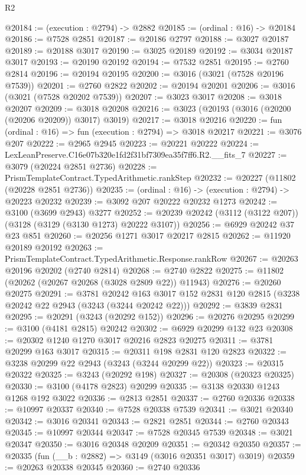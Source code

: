 \begin{lexlean}{R2}
\begin{coremodule}
@20184 := (execution : @2794) -> @2882
@20185 := (ordinal : @16) -> @20184
@20186 := @7528 @2851
@20187 := @20186 @2797
@20188 := @3027 @20187
@20189 := @20188 @3017
@20190 := @3025 @20189
@20192 := @3034 @20187 @3017
@20193 := @20190 @20192
@20194 := @7532 @2851
@20195 := @2760 @2814
@20196 := @20194 @20195
@20200 := @3016 (@3021 (@7528 @20196 @7539))
@20201 := @2760 @2822
@20202 := @20194 @20201
@20206 := @3016 (@3021 (@7528 @20202 @7539))
@20207 := @3023 @3017
@20208 := @3018 @20207
@20209 := @3018 @20208
@20216 := @3023 (@20193 (@3016 (@20200 (@20206 @20209)) @3017) @3019)
@20217 := @3018 @20216
@20220 := fun (ordinal : @16) => fun (execution : @2794) => @3018 @20217
@20221 := @3076 @207
@20222 := @2965 @2945
@20223 := @20221 @20222
@20224 := LexLeanPreserve.C16e07b320e1fd2f31bf7309ea35f7ff6.R2.__fits_7
@20227 := @3079 (@20224 @2851 @2736)
@20228 := PrismTemplateContract.TypedArithmetic.rankStep
@20232 := @20227 (@11802 (@20228 @2851 @2736))
@20235 := (ordinal : @16) -> (execution : @2794) -> @20223 @20232
@20239 := @3092 @207 @20222 @20232 @1273
@20242 := @3100 (@3699 @2943) @3277
@20252 := @20239 @20242 (@3112 (@3122 @207)) (@3128 (@3129 (@3130 @1273) @20222 @3107))
@20256 := @6929 @20242 @37 @23 @851
@20260 := @20256 @1271 @3017 @20217 @2815
@20262 := @11920 @20189 @20192
@20263 := PrismTemplateContract.TypedArithmetic.Response.rankRow
@20267 := @20263 @20196 @20202 (@2740 @2814)
@20268 := @2740 @2822
@20275 := @11802 (@20262 (@20267 @20268 (@3028 @2809 @22)) @11943)
@20276 := @20260 @20275
@20291 := @3781
    @20242
    @163
    @3017
    @152
    @2831
    @120
    @2815
    (@3238 @20242 @22 @2943 (@3243 (@3244 @20242 @22)))
@20292 := @3839 @2831
@20295 := @20291 (@3243 (@20292 @152))
@20296 := @20276 @20295
@20299 := @3100 (@4181 @2815) @20242
@20302 := @6929 @20299 @132 @23
@20308 := @20302 @1240 @1270 @3017 @20216 @2823 @20275
@20311 := @3781 @20299 @163 @3017
@20315 := @20311 @198 @2831 @120 @2823
@20322 := @3238 @20299 @22 @2943 (@3243 (@3244 @20299 @22))
@20323 := @20315 @20322
@20325 := @3243 (@20292 @198)
@20327 := @20308 (@20323 @20325)
@20330 := @3100 (@4178 @2823) @20299
@20335 := @3138 @20330 @1243 @1268 @192 @3022
@20336 := @2813 @2851
@20337 := @2760 @20336
@20338 := @10997 @20337
@20340 := @7528 @20338 @7539
@20341 := @3021 @20340
@20342 := @3016 @20341
@20343 := @2821 @2851
@20344 := @2760 @20343
@20345 := @10997 @20344
@20347 := @7528 @20345 @7539
@20348 := @3021 @20347
@20350 := @3016 @20348 @20209
@20351 := @20342 @20350
@20357 := @20335 (fun (__b : @2882) => @3149 (@3016 @20351 @3017) @3019)
@20359 := @20263 @20338 @20345
@20360 := @2740 @20336

\end{coremodule}
\end{lexlean}
